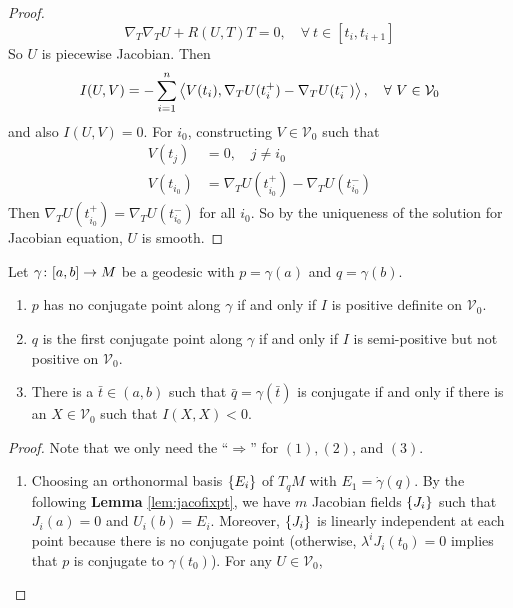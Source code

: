 \begin{enumerate}[label=\arabic{*}.]
\begin{proof}
\begin{equation*}
			\nabla_T\nabla_TU + R(U,T)T = 0,\quad \forall~t \in [t_i,t_{i+1}]
		\end{equation*}
		So $U$ is piecewise Jacobian. Then
		\begin{equation*}
			I(U,V) = -\sum_{i = 1}^n \left\langle V(t_i),\nabla_TU(t_i^+) - \nabla_TU(t_i^-) \right\rangle,\quad \forall~ V \in \mathcal{V}_0
		\end{equation*}
		and also $I(U,V) = 0$. For $i_0$, constructing $V \in \mathcal{V}_0$ such that
		\begin{equation*}
			\begin{aligned}
				V(t_j) &= 0,\quad j\neq i_0\\
				V(t_{i_0}) &= \nabla_TU(t_{i_0}^+) - \nabla_TU(t_{i_0}^-)
			\end{aligned}
		\end{equation*}
		Then $\nabla_TU(t_{i_0}^+) = \nabla_TU(t_{i_0}^-)$ for all $i_0$. So by the uniqueness of the solution for Jacobian equation, $U$ is smooth.
	\end{proof}
	\begin{thm}
		Let $\gamma \colon [a,b] \rightarrow M$ be a geodesic with $p = \gamma(a)$ and $q = \gamma(b)$.
		\begin{enumerate}[label=(\arabic{*})]
			\item $p$ has no conjugate point along $\gamma$ if and only if $I$ is positive definite on $\mathcal{V}_0$.
			\item $q$ is the first conjugate point along $\gamma$ if and only if $I$ is semi-positive but not positive on $\mathcal{V}_0$.
			\item There is a $\bar{t} \in (a,b)$ such that $\bar{q} = \gamma(\bar{t})$ is conjugate  if and only if there is an $X \in \mathcal{V}_0$ such that $I(X,X) < 0$.
		\end{enumerate}
	\end{thm}
	\begin{proof}
		Note that we only need the ``$\Rightarrow$'' for $(1),(2)$, and $(3)$.
		\begin{enumerate}[label=(\arabic{*})]
			\item Choosing an orthonormal basis $\left\{E_i\right\}$ of $T_qM$ with $E_1 = \dot{\gamma}(q)$. By the following \textbf{Lemma} \ref{lem:jacofixpt}, we have $m$ Jacobian fields $\left\{J_i\right\}$ such that $J_i(a) = 0$ and $U_i(b)=E_i$. Moreover, $\left\{J_i\right\}$ is linearly independent at each point because there is no conjugate point (otherwise, $\lambda^iJ_i(t_0) = 0$ implies that $p$ is conjugate to $\gamma(t_0)$). For any $U \in \mathcal{V}_0$, 
			\begin{equation*}

\end{equation*}
\end{enumerate}
\end{proof}
\end{enumerate}

